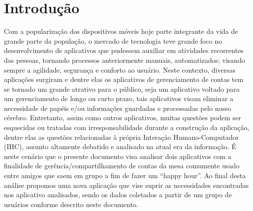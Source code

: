 \chapter*[Introdução]{Introdução}


Com a popularização dos dispositivos móveis hoje parte integrante da vida de grande parte da população, o mercado de tecnologia teve grande foco no desenvolvimento de aplicativos que pudessem auxiliar em atividades recorrentes das pessoas, tornando processos anteriormente manuais, automatizados; visando sempre a agilidade, segurança e conforto ao usuário.
Neste contexto, diversas aplicações surgiram e dentre elas os aplicativos de gerenciamento de contas tem se tornado um grande atrativo para o público, seja um aplicativo voltado para um gerenciamento de longo ou curto prazo, tais aplicativos visam eliminar a necessidade de papéis e/ou informações guardadas e processadas pelo nosso cérebro.
Entretanto, assim como outros aplicativos, muitas questões podem ser esquecidas ou tratadas com irresponsabilidade durante a construção da aplicação, dentre elas as questões relacionadas à própria Interação Humano-Computador (IHC), assunto altamente debatido e analisado na atual era da informação.
É neste cenário que o presente documento visa analisar dois aplicativos com a finalidade de gerência/compartilhamento de contas da mesa comumente usado entre amigos que saem em grupo a fim de fazer um “happy hour”. Ao final desta análise propomos uma nova aplicação que vise suprir as necessidades encontradas nos aplicativo analisados, sendo os dados coletados a partir de um grupo de usuários conforme descrito neste documento.
